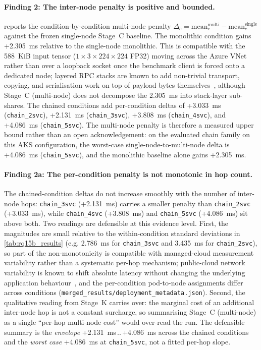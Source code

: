 \paragraph{Finding 2: The inter-node penalty is positive and bounded.}
 reports the condition-by-condition multi-node penalty
$\Delta_c = \mathrm{mean}_c^{\mathrm{multi}} - \mathrm{mean}_c^{\mathrm{single}}$
against the frozen single-node Stage~C baseline. The monolithic condition
gains +2.305~ms relative to the single-node monolithic. This is compatible
with the 588~KiB input tensor ($1\times3\times224\times224$ FP32) moving
across the Azure VNet rather than over a loopback socket once the benchmark
client is forced onto a dedicated node; layered RPC stacks are known to add
non-trivial transport, copying, and serialisation work on top of payload
bytes themselves~\cite{rpc_overhead_hotos25}, although Stage~C (multi-node) does not
decompose the 2.305~ms into stack-layer sub-shares. The chained conditions
add per-condition deltas of +3.033~ms (\texttt{chain\_2svc}), +2.131~ms
(\texttt{chain\_3svc}), +3.808~ms (\texttt{chain\_4svc}), and +4.086~ms
(\texttt{chain\_5svc}). The multi-node penalty is therefore a measured upper
bound rather than an open acknowledgement: on the evaluated chain family on
this AKS configuration, the worst-case single-node-to-multi-node delta is
+4.086~ms (\texttt{chain\_5svc}), and the monolithic baseline alone gains
+2.305~ms.

\paragraph{Finding 2a: The per-condition penalty is not monotonic in hop count.}
The chained-condition deltas do not increase smoothly with the number of
inter-node hops: \texttt{chain\_3svc} (+2.131~ms) carries a smaller penalty
than \texttt{chain\_2svc} (+3.033~ms), while \texttt{chain\_4svc} (+3.808~ms)
and \texttt{chain\_5svc} (+4.086~ms) sit above both. Two readings are
defensible at this evidence level. First, the magnitudes are small relative
to the within-condition standard deviations in
\cref{tab:rq15b_results} (e.g. 2.786~ms for \texttt{chain\_3svc} and
3.435~ms for \texttt{chain\_2svc}), so part of the non-monotonicity is
compatible with managed-cloud measurement variability rather than a
systematic per-hop mechanism; public-cloud network variability is known to
shift absolute latency without changing the underlying application
behaviour~\cite{noise_in_clouds,noisy_neighbor_k8s}, and the per-condition
pod-to-node assignments differ across conditions
(\texttt{merged\_results/deployment\_metadata.json}). Second, the
qualitative reading from Stage~K carries over: the marginal cost of an
additional inter-node hop is not a constant surcharge, so summarising
Stage~C (multi-node) as a single ``per-hop multi-node cost'' would over-read the run.
The defensible summary is the \emph{envelope}
+2.131~ms\,..\,+4.086~ms across the chained conditions and the
\emph{worst case} +4.086~ms at \texttt{chain\_5svc}, not a fitted per-hop
slope.

